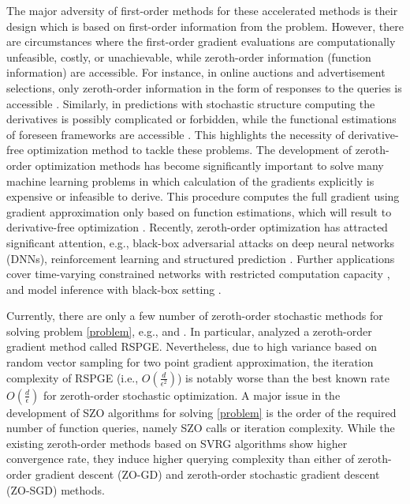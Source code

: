 The major adversity of first-order methods for these accelerated methods is their design which is based on first-order information from the problem. However, there are circumstances where the first-order gradient evaluations are computationally unfeasible, costly, or unachievable, while zeroth-order information (function information) are accessible. For instance, in online auctions and advertisement
selections, only zeroth-order information in the form of responses to the queries is accessible \cite{wibisono2012finite}. Similarly, in predictions with stochastic structure computing the derivatives is possibly complicated or forbidden, while the functional estimations of foreseen frameworks are accessible \cite{sokolov2016stochastic}. 
This highlights the
necessity of derivative-free  optimization method \cite{nesterov2017random} to tackle these problems. The development of zeroth-order optimization methods has become significantly important to solve many machine learning problems in which calculation of the gradients explicitly is expensive or infeasible to derive. 
This procedure computes the full gradient using gradient approximation only based on function estimations, which will result to derivative-free optimization \cite{brent2013algorithms,spall2005introduction}. 
Recently, zeroth-order optimization has attracted significant attention, e.g., black-box adversarial attacks on deep neural networks (DNNs)\cite{kurakin2016adversarial,papernot2017practical,chen2017zoo}, reinforcement learning \cite{choromanski2018structured} and structured prediction \cite{taskar2005learning}.
Further applications cover time-varying constrained networks with restricted computation capacity \cite{chen2019bandit,liu2017zeroth}, and model inference with black-box setting \cite{fu2002optimization,lian2016comprehensive}. 

Currently, there are only a few number of zeroth-order stochastic methods
for solving problem \eqref{problem}, e.g., \cite{ghadimi2016accelerated} and \cite{huang2019faster}. In particular, \cite{ghadimi2016accelerated} analyzed a zeroth-order gradient method called RSPGE. Nevertheless, due to high variance based on random vector sampling for two point gradient approximation, the iteration complexity of RSPGE (i.e., $O(\frac{d}{\epsilon^2})$) is notably worse than the best known rate $O(\frac{d}{{\epsilon}})$ for zeroth-order stochastic optimization. A major issue in the development of SZO algorithms for solving  \eqref{problem} is the order of the required number of function queries, namely SZO calls or iteration complexity. While the existing zeroth-order methods based on SVRG algorithms show higher convergence rate, they induce higher querying complexity than either of zeroth-order gradient descent (ZO-GD) and zeroth-order stochastic gradient descent (ZO-SGD) methods.  

